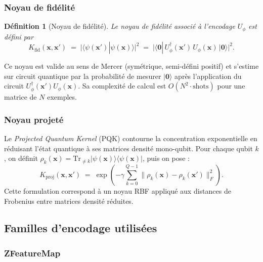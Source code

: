 \documentclass[12pt,a4paper]{article}
\newtheorem{definition}{Définition}[section]
\begin{document}
\subsubsection{Noyau de fidélité}

\begin{definition}[Noyau de fidélité]
Le \emph{noyau de fidélité} associé à l'encodage $U_\phi$ est défini par
\begin{equation}
  K_{\mathrm{fid}}(\bm{x}, \bm{x}') \;=\;
  \bigl|\langle\psi(\bm{x}')|\psi(\bm{x})\rangle\bigr|^2
  \;=\;
  \bigl|\langle\bm{0}|\,U_\phi^\dagger(\bm{x}')\,U_\phi(\bm{x})\,|\bm{0}\rangle\bigr|^2.
  \label{eq:fidelity}
\end{equation}
\end{definition}

Ce noyau est valide au sens de Mercer (symétrique, semi-défini positif) et
s'estime sur circuit quantique par la probabilité de mesurer $|\bm{0}\rangle$
après l'application du circuit $U_\phi^\dagger(\bm{x}')U_\phi(\bm{x})$.
Sa complexité de calcul est $O(N^2 \cdot \mathrm{shots})$ pour une matrice
de $N$ exemples.

\subsubsection{Noyau projeté}

Le \emph{Projected Quantum Kernel} (PQK) \cite{huang2021} contourne la
concentration exponentielle en réduisant l'état quantique à ses matrices
densité mono-qubit.
Pour chaque qubit $k$, on définit
$\rho_k(\bm{x}) = \mathrm{Tr}_{\neq k}|\psi(\bm{x})\rangle\langle\psi(\bm{x})|$,
puis on pose :
\begin{equation}
  K_{\mathrm{proj}}(\bm{x}, \bm{x}') \;=\;
  \exp\!\left(-\gamma \sum_{k=0}^{Q-1}
  \bigl\|\rho_k(\bm{x}) - \rho_k(\bm{x}')\bigr\|_F^2\right).
  \label{eq:projected}
\end{equation}
Cette formulation correspond à un noyau RBF appliqué aux distances de
Frobenius entre matrices densité réduites.

\subsection{Familles d'encodage utilisées}

\subsubsection{ZFeatureMap}
\end{document}
